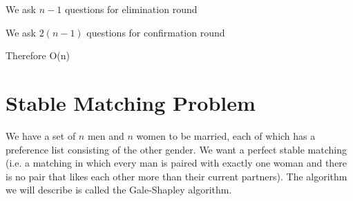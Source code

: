 {
    \item We ask $n - 1$ questions for elimination round
    \item We ask $2(n-1)$ questions for confirmation round
    \item Therefore O(n)
}


\section{Stable Matching Problem}
We have a set of $n$ men and $n$ women to be married, each of which has a preference list consisting of the other gender. We want a perfect stable matching (i.e. a matching in which every man is paired with exactly one woman and there is no pair that likes each other more than their current partners). The algorithm we will describe is called the Gale-Shapley algorithm.

